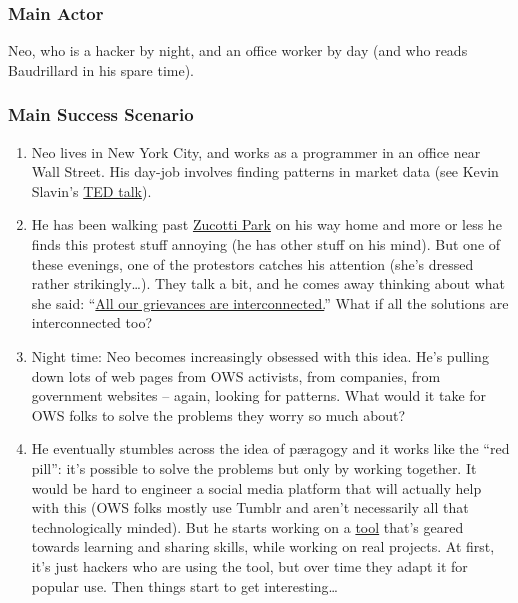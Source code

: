 \subsubsection{Main Actor}

Neo, who is a hacker by night, and an office worker by day (and who
reads Baudrillard in his spare time).

\subsubsection{Main Success Scenario}

\begin{enumerate}
\item
  Neo lives in New York City, and works as a programmer in an office
  near Wall Street. His day-job involves finding patterns in market data
  (see Kevin Slavin's
  \href{http://www.ted.com/talks/kevin\_slavin\_how\_algorithms\_shape\_our\_world.html}{TED
  talk}).
\item
  He has been walking past
  \href{http://en.wikipedia.org/wiki/Zuccotti\_Park}{Zucotti Park} on
  his way home and more or less he finds this protest stuff annoying (he
  has other stuff on his mind). But one of these evenings, one of the
  protestors catches his attention (she's dressed rather
  strikingly\ldots{}). They talk a bit, and he comes away thinking about
  what she said:
  ``\href{http://www.nycga.net/files/2011/11/DeclarationFlowchart\_v2\_large.jpg}{All
  our grievances are interconnected.}'' What if all the solutions are
  interconnected too?
\item
  Night time: Neo becomes increasingly obsessed with this idea. He's
  pulling down lots of web pages from OWS activists, from companies,
  from government websites -- again, looking for patterns. What would it
  take for OWS folks to solve the problems they worry so much about?
\item
  He eventually stumbles across the idea of pæragogy and it works like
  the ``red pill'': it's possible to solve the problems but only by
  working together. It would be hard to engineer a social media platform
  that will actually help with this (OWS folks mostly use Tumblr and
  aren't necessarily all that technologically minded). But he starts
  working on a
  \href{http://campus.ftacademy.org/wiki/index.php/Free\_Technology\_Guild}{tool}
  that's geared towards learning and sharing skills, while working on
  real projects. At first, it's just hackers who are using the tool, but
  over time they adapt it for popular use. Then things start to get
  interesting\ldots{}
\end{enumerate}
